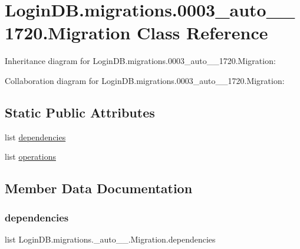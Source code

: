 \hypertarget{class_login_d_b_1_1migrations_1_10003__auto__20201206__1720_1_1_migration}{}\section{Login\+D\+B.\+migrations.0003\+\_\+auto\+\_\+\_\+1720.Migration Class Reference}
\label{class_login_d_b_1_1migrations_1_10003__auto__20201206__1720_1_1_migration}


Inheritance diagram for Login\+D\+B.\+migrations.0003\+\_\+auto\+\_\+\_\+1720.Migration\+:


Collaboration diagram for Login\+D\+B.\+migrations.0003\+\_\+auto\+\_\+\_\+1720.Migration\+:
\subsection*{Static Public Attributes}
\begin{DoxyCompactItemize}
\item 
list \hyperlink{class_login_d_b_1_1migrations_1_10003__auto__20201206__1720_1_1_migration_a41de9407a30d49c2ee4c3c160fc59a03}{dependencies}
\item 
list \hyperlink{class_login_d_b_1_1migrations_1_10003__auto__20201206__1720_1_1_migration_ae20b162455f88dd14980f2e20090db64}{operations}
\end{DoxyCompactItemize}


\subsection{Member Data Documentation}
\mbox{\label{class_login_d_b_1_1migrations_1_10003__auto__20201206__1720_1_1_migration_a41de9407a30d49c2ee4c3c160fc59a03}} 
\subsubsection{\texorpdfstring{dependencies}{dependencies}}
{\footnotesize\ttfamily list Login\+D\+B.\+migrations.\+\_\+auto\+\_\+\_.\+Migration.\+dependencies\hspace{0.3cm}{\ttfamily [static]}}

